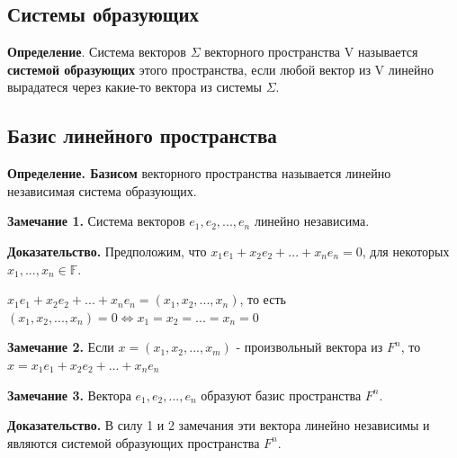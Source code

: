 \documentclass[a4paper]{article}
\begin{document}
    \newpage \begin{center}
                 \begin{Large}
                 \end{Large}
    \end{center}
    \subsection*{Системы образующих}
    \textbf{Определение}. Система векторов $\Sigma$ векторного пространства V называется \textbf{системой образующих} этого пространства, если любой вектор из V линейно вырадатеся через какие-то вектора из системы $\Sigma$.

    \subsection*{Базис линейного пространства}
    \textbf{Определение. Базисом} векторного пространства называется линейно независимая
    система образующих.

    \begin{htheorem}
        \textbf{Замечание 1.} Система векторов $e_1, e_2, ..., e_n$ линейно независима.
    \end{htheorem}


    \begin{hproof}
        \textbf{Доказательство.} Предположим, что $x_1e_1+x_2e_2 + ... + x_ne_n = 0$, для некоторых $x_1, ..., x_n \in \mathbb{F}$.

        $x_1e_1+x_2e_2 + ... + x_ne_n = (x_1, x_2, ..., x_n)$, то есть $(x_1, x_2, ..., x_n) = 0 \Leftrightarrow x_1 = x_2 = ... = x_n = 0$
    \end{hproof}

    \begin{htheorem}
        \textbf{Замечание 2.} Если $x = (x_1, x_2, ..., x_m) $ - произвольный вектора из $F^n$, то $x = x_1e_1 + x_2e_2 + ... + x_ne_n$
    \end{htheorem}


    \begin{htheorem}
        \textbf{Замечание 3.} Вектора $e_1, e_2, ..., e_n$ образуют базис пространства $F^n$.
    \end{htheorem}

    \begin{hproof}
        \textbf{Доказательство.} В силу 1 и 2 замечания эти вектора линейно независимы и являются системой образующих пространства $F^n$.
    \end{hproof}
\end{document}
